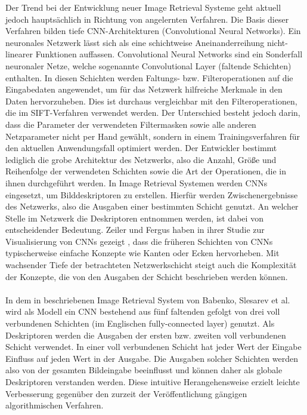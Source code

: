 Der Trend bei der Entwicklung neuer Image Retrieval Systeme geht aktuell jedoch hauptsächlich in Richtung von angelernten Verfahren. Die Basis dieser Verfahren bilden tiefe CNN-Architekturen (Convolutional Neural Networks). Ein neuronales Netzwerk lässt sich als eine schichtweise Aneinanderreihung nicht-linearer Funktionen auffassen. Convolutional Neural Networks sind ein Sonderfall neuronaler Netze, welche sogenannte Convolutional Layer (faltende Schichten) enthalten. In diesen Schichten werden Faltungs- bzw. Filteroperationen auf die Eingabedaten angewendet, um für das Netzwerk hilfreiche Merkmale in den Daten hervorzuheben. Dies ist durchaus vergleichbar mit den Filteroperationen, die im SIFT-Verfahren verwendet werden. Der Unterschied besteht jedoch darin, dass die Parameter der verwendeten Filtermasken sowie alle anderen Netzparameter nicht per Hand gewählt, sondern in einem Trainingsverfahren für den aktuellen Anwendungsfall optimiert werden. Der Entwickler bestimmt lediglich die grobe Architektur des Netzwerks, also die Anzahl, Größe und Reihenfolge der verwendeten Schichten sowie die Art der Operationen, die in ihnen durchgeführt werden. In Image Retrieval Systemen werden CNNs eingesetzt, um Bilddeskriptoren zu erstellen. Hierfür werden Zwischenergebnisse des Netzwerks, also die Ausgaben einer bestimmten Schicht genutzt. An welcher Stelle im Netzwerk die Deskriptoren entnommen werden, ist dabei von entscheidender Bedeutung. Zeiler und Fergus haben in ihrer Studie zur Visualisierung von CNNs gezeigt \cite{extraction_point_meaning}, dass die früheren Schichten von CNNs typischerweise einfache Konzepte wie Kanten oder Ecken hervorheben. Mit wachsender Tiefe der betrachteten Netzwerkschicht steigt auch die Komplexität der Konzepte, die von den Ausgaben der Schicht beschrieben werden können.
\\\\
In dem in \cite{fc_extraction_neural_codes} beschriebenen Image Retrieval System von Babenko, Slesarev et al. wird als Modell ein CNN bestehend aus fünf faltenden gefolgt von drei voll verbundenen Schichten (im Englischen fully-connected layer) genutzt. Als Deskriptoren werden die Ausgaben der ersten bzw. zweiten voll verbundenen Schicht verwendet. In einer voll verbundenen Schicht hat jeder Wert der Eingabe Einfluss auf jeden Wert in der Ausgabe. Die Ausgaben solcher Schichten werden also von der gesamten Bildeingabe beeinflusst und können daher als globale Deskriptoren verstanden werden. Diese intuitive Herangehensweise erzielt leichte Verbesserung gegenüber den zurzeit der Veröffentlichung gängigen algorithmischen Verfahren.
